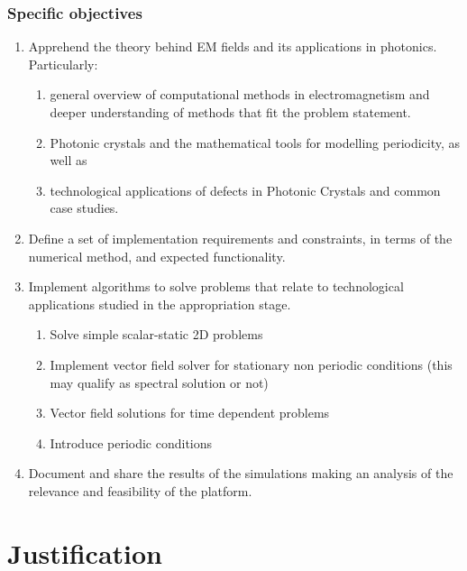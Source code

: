 \subsubsection{Specific objectives}
\begin{enumerate}
\item  Apprehend the theory behind EM fields and its applications in photonics. Particularly: 
\begin{enumerate}
	 \item general overview of computational methods in electromagnetism and deeper understanding of methods that fit the problem statement.
	 \item Photonic crystals and the mathematical tools for modelling periodicity, as well as 
	 \item technological applications of defects in Photonic Crystals and common case studies. 
\end{enumerate}

\item Define a set of implementation requirements and constraints, in terms of the numerical method, and expected functionality.  

\item Implement algorithms to solve problems that relate to technological applications studied in the appropriation stage. 
	\begin{enumerate}
	\item Solve simple scalar-static 2D problems
	\item Implement vector field solver for stationary non periodic conditions (this may qualify as spectral solution or not)
	\item Vector field solutions for time dependent problems
	\item Introduce periodic conditions
	\end{enumerate}
	
\item Document and share the results of the simulations making an analysis of the relevance and feasibility of the platform. 
\end{enumerate}

\section{Justification}

